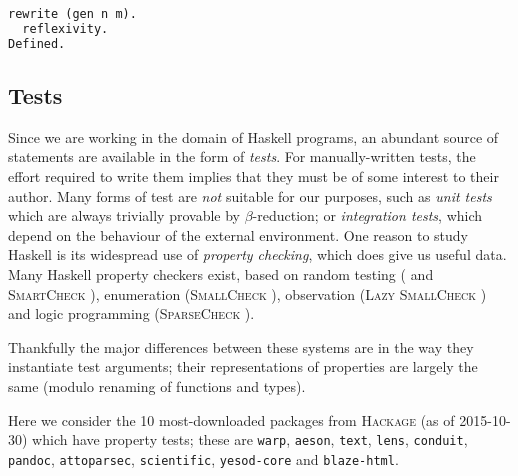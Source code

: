 \begin{lstlisting}[language=ML, xleftmargin=.2\textwidth, xrightmargin=.2\textwidth]
  rewrite (gen n m).
  reflexivity.
Defined.
\end{lstlisting}

\fi

\subsection{Tests}
\label{sec:tests}

Since we are working in the domain of Haskell programs, an abundant source of statements are available in the form of \emph{tests}. For manually-written tests, the effort required to write them implies that they must be of some interest to their author. Many forms of test are \emph{not} suitable for our purposes, such as \emph{unit tests} which are always trivially provable by $\beta$-reduction; or \emph{integration tests}, which depend on the behaviour of the external environment. One reason to study Haskell is its widespread use of \emph{property checking}, which does give us useful data. Many Haskell property checkers exist, based on random testing (\qcheck{} \citep{claessen2011quickcheck} and \textsc{SmartCheck} \citep{pike2014smartcheck}), enumeration (\textsc{SmallCheck} \citep{runciman2008smallcheck}), observation (\textsc{Lazy SmallCheck} \citep{reich2013advances}) and logic programming (\textsc{SparseCheck} \citep{sparsecheck}).

Thankfully the major differences between these systems are in the way they instantiate test arguments; their representations of properties are largely the same (modulo renaming of functions and types).

Here we consider the 10 most-downloaded packages from \textsc{Hackage} (as of 2015-10-30) which have property tests; these are \texttt{warp}, \texttt{aeson}, \texttt{text}, \texttt{lens}, \texttt{conduit}, \texttt{pandoc}, \texttt{attoparsec}, \texttt{scientific}, \texttt{yesod-core} and \texttt{blaze-html}.

